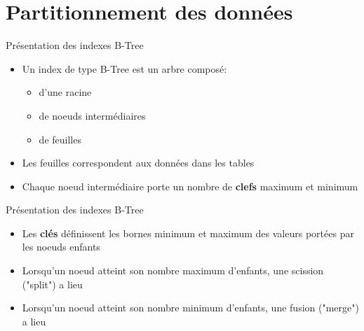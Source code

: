 
\section{Partitionnement des données}


\begin{frame}[fragile]{Présentation des indexes B-Tree}

   \begin{itemize}
      \item Un index de type B-Tree est un arbre composé:
      \begin{itemize}
         \item d'une racine
         \item de noeuds intermédiaires
         \item de feuilles
      \end{itemize}
      \item Les feuilles correspondent aux données dans les tables
      \item Chaque noeud intermédiaire porte un nombre de \textbf{clefs} maximum et minimum

   \end{itemize}

\begin{toile}
\end{toile}

\end{frame}


\begin{frame}[fragile]{Présentation des indexes B-Tree}

   \begin{itemize}
      \item Les \textbf{clés} définissent les bornes minimum et maximum des valeurs portées par les noeuds enfants
      \item Lorsqu'un noeud atteint son nombre maximum d'enfants, une scission ("split") a lieu
      \item Lorsqu'un noeud atteint son nombre minimum d'enfants, une fusion ("merge") a lieu

   \end{itemize}

\end{frame}


